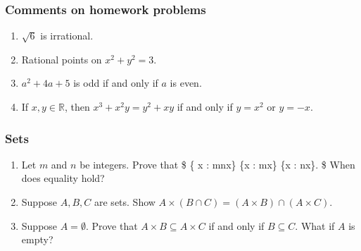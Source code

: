 \documentclass[
]{article}
\author{}
\date{}
\providecommand{\tightlist}{%
  \setlength{\itemsep}{0pt}\setlength{\parskip}{0pt}}
\begin{document}
\hypertarget{comments-on-homework-problems}{%
\subsubsection{Comments on homework
problems}\label{comments-on-homework-problems}}

\begin{enumerate}
\def\labelenumi{\arabic{enumi}.}
\tightlist
\item
  \(\sqrt{6}\) is irrational.
\item
  Rational points on \(x^2+y^2=3\).
\item
  \(a^2+4a+5\) is odd if and only if \(a\) is even.
\item
  If \(x,y\in\mathbb{R}\), then \(x^3+x^2y=y^2+xy\) if and only if
  \(y=x^2\) or \(y=-x\).
\end{enumerate}

\hypertarget{sets}{%
\subsubsection{Sets}\label{sets}}

\begin{enumerate}
\def\labelenumi{\arabic{enumi}.}
\tightlist
\item
  Let \(m\) and \(n\) be integers. Prove that \$ \{ x\in{} :
  mn\textbar x\} \subseteq \{x\in{} : m\textbar x\}
  \cap \{x\in{} : n\textbar x\}. \$ When does equality hold?
\item
  Suppose \(A, B, C\) are sets. Show
  \(A×(B\cap C ) = (A\times B)\cap (A\times C)\).
\item
  Suppose \(A=\emptyset\). Prove that \(A× B⊆ A× C\) if and only if
  \(B⊆ C\). What if \(A\) is empty?
\end{enumerate}
\end{document}
